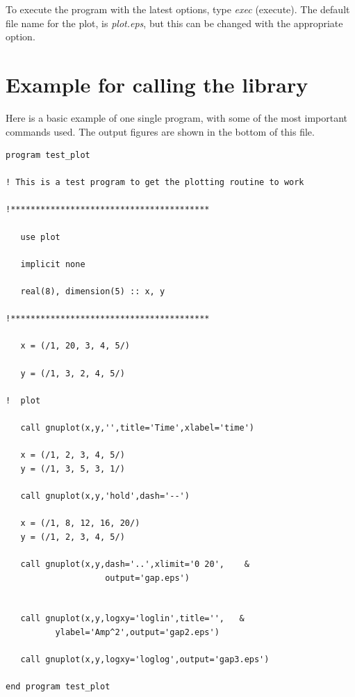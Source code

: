 \documentclass{article}
\begin{document}
To execute the program with the latest options, type {\it exec} (execute). The default file name for the plot, is {\it plot.eps}, but this can be changed with the appropriate option.

\section{Example for calling the library}
Here is a basic example of one single program, with some of the most important commands used. The output figures are shown in the bottom of this file. 
\begin{verbatim}
program test_plot

! This is a test program to get the plotting routine to work

!****************************************

   use plot

   implicit none

   real(8), dimension(5) :: x, y

!****************************************

   x = (/1, 20, 3, 4, 5/)

   y = (/1, 3, 2, 4, 5/)

!  plot

   call gnuplot(x,y,'',title='Time',xlabel='time')
   
   x = (/1, 2, 3, 4, 5/)
   y = (/1, 3, 5, 3, 1/)

   call gnuplot(x,y,'hold',dash='--')

   x = (/1, 8, 12, 16, 20/)
   y = (/1, 2, 3, 4, 5/)

   call gnuplot(x,y,dash='..',xlimit='0 20',    & 
                    output='gap.eps')
   
   
   call gnuplot(x,y,logxy='loglin',title='',   &
   	      ylabel='Amp^2',output='gap2.eps')

   call gnuplot(x,y,logxy='loglog',output='gap3.eps')

end program test_plot
\end{verbatim}
\end{document}
